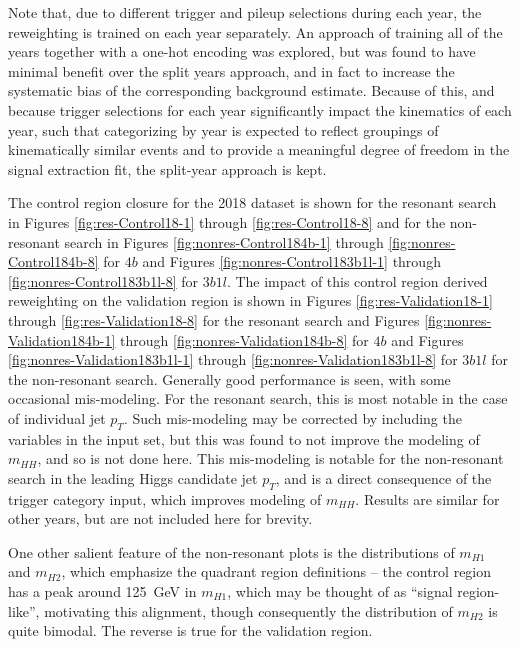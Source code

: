 Note that, due to different trigger and pileup selections during each year, 
the reweighting is trained on each year separately. An approach of training all of the years 
together with a one-hot encoding was explored, but was found to have minimal 
benefit over the split years approach, and in fact to increase 
the systematic bias of the corresponding background estimate.
Because of this, and because trigger selections for each year significantly impact the kinematics of each year, 
such that categorizing by year is expected to reflect groupings of kinematically similar events and 
to provide a meaningful degree of freedom in the signal extraction fit, the split-year approach is
kept.

The control region closure for the 2018 dataset is shown for the resonant search in Figures \ref{fig:res-Control18-1} 
through \ref{fig:res-Control18-8} and for the non-resonant search in Figures \ref{fig:nonres-Control184b-1} 
through \ref{fig:nonres-Control184b-8} for $4b$ and Figures \ref{fig:nonres-Control183b1l-1} 
through \ref{fig:nonres-Control183b1l-8} for $3b1l$. The impact of this control 
region derived reweighting on the validation region is shown in Figures \ref{fig:res-Validation18-1} 
through \ref{fig:res-Validation18-8} for the resonant search and Figures \ref{fig:nonres-Validation184b-1} 
through \ref{fig:nonres-Validation184b-8} for $4b$ and Figures \ref{fig:nonres-Validation183b1l-1} 
through \ref{fig:nonres-Validation183b1l-8} for $3b1l$ for the non-resonant 
search. Generally good performance is seen, with some occasional mis-modeling. For the resonant 
search, this is most notable in the case of individual jet $p_{T}$. Such mis-modeling may be corrected 
by including the variables in the input set, but this was found to not improve the modeling of $m_{HH}$, 
and so is not done here. This mis-modeling is notable for the non-resonant search in the leading Higgs candidate 
jet $p_{T}$, and is a direct consequence of the trigger category input, which improves modeling of $m_{HH}$.
Results are similar for other years, but are not included here for brevity. 

One other salient feature of the non-resonant plots is the distributions of $m_{H1}$ and $m_{H2}$, which 
emphasize the quadrant region definitions -- the control region has a peak around \SI{125}{\GeV} in $m_{H1}$, 
which may be thought of as ``signal region-like'', motivating this alignment, though consequently the 
distribution of $m_{H2}$ is quite bimodal. The reverse is true for the validation region.

